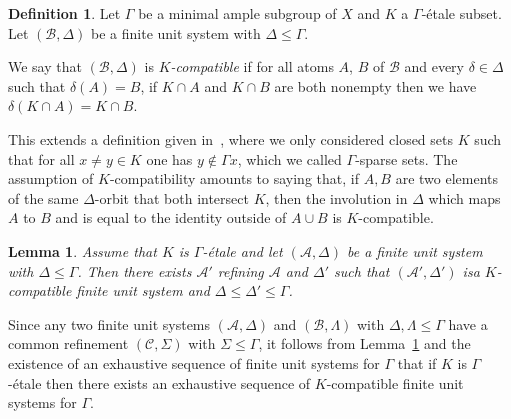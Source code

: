 \documentclass[10pt,a4paper]{article}
\newtheorem{lemm}[theo]{Lemma}
\theoremstyle{definition}
\newtheorem{defi}[theo]{Definition}
\newcommand{\mcA}{\mathcal{A}}
\newcommand{\mcB}{\mathcal{B}}
\newcommand{\mcC}{\mathcal{C}}
\begin{document}
\begin{defi}
Let $\Gamma$ be a minimal ample subgroup of $X$ and $K$ a $\Gamma$-étale subset. Let $(\mcB,\Delta)$ be a finite unit system with $\Delta \le \Gamma$.

We say that $(\mcB,\Delta)$ is \emph{$K$-compatible} if for all atoms $A$, $B$ of $\mcB$ and every $\delta \in \Delta$ such that $\delta(A)=B$, if $K \cap A$ and $K \cap B$ are both nonempty then we have $\delta(K \cap A)= K \cap B$.
\end{defi}

This extends a definition given in~\cite[Definition~3.10]{Melleray2023}, where we only considered closed sets $K$ such that for all $x\ne y \in K$ one has $y \not \in \Gamma x$, which we called $\Gamma$-sparse sets. The assumption of $K$-compatibility amounts to saying that, if $A,B$ are two elements of the same $\Delta$-orbit that both intersect $K$, then the involution in $\Delta$ which maps $A$ to $B$ and is equal to the identity outside of $A \cup B$ is $K$-compatible.

\begin{lemm}\label{l:refining_to_compatible}
Assume that $K$ is $\Gamma$-étale and let $(\mcA,\Delta)$ be a finite unit system with $\Delta \le \Gamma$. Then there exists $\mcA'$ refining $\mcA$ and $\Delta'$ such that $(\mcA',\Delta')$ is\linebreak a $K$-compatible finite unit system and $\Delta \le \Delta' \le \Gamma$.
\end{lemm}

Since any two finite unit systems $(\mcA,\Delta)$ and $(\mcB,\Lambda)$ with $\Delta, \Lambda \le \Gamma$ have a common refinement $(\mcC,\Sigma)$ with $\Sigma \le \Gamma$, it follows from Lemma~\ref{l:refining_to_compatible} and the existence of an exhaustive sequence of finite unit systems for $\Gamma$ that if $K$ is $\Gamma$-étale then there exists an exhaustive sequence of $K$-compatible finite unit systems for $\Gamma$.
\end{document}
